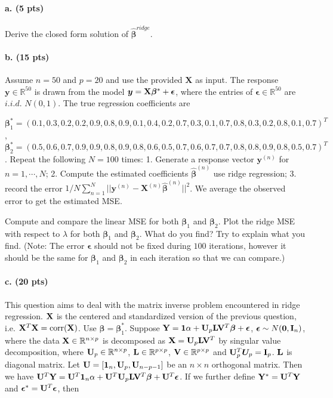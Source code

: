 \documentclass[11pt]{article}
\newcommand{\Imat}{{\bf I}}
\newcommand{\Lmat}[0]{{{\bf L}}}
\newcommand{\Umat}[0]{{{\bf U}}}
\newcommand{\Vmat}[0]{{{\bf V}}}
\newcommand{\Xmat}[0]{{{\bf X}}}
\newcommand{\Ymat}{{\bf Y}}
\newcommand{\yv}{\boldsymbol{y}}
\newcommand{\betav}[0]{{\boldsymbol{\beta}}}
\newcommand{\epsilonv}{\boldsymbol{\epsilon}}
\begin{document}
\paragraph{a. (5 pts)} Derive the closed form solution of $\hat{\betav}^{ridge}$. 
\paragraph{b. (15 pts)} Assume $n=50$ and $p=20$ and use the provided $\bm X$ as input.
The response $\yv\in\mathbb{R}^{50}$ is drawn from the model $\yv=\Xmat\betav^*+\epsilonv$, where the entries of $\epsilonv\in\mathbb{R}^{50}$ are $i.i.d.$ $N(0,1)$.
The true regression coefficients are 

\noindent$\betav_1^*=(0.1,0.3,0.2,0.2,0.9,0.8,0.9,0.1,0.4,0.2,0.7,0.3,0.1,0.7,0.8,0.3,0.2,0.8,0.1,0.7)^T$, $\betav_2^*=(0.5,0.6,0.7,0.9,0.9,0.8,0.9,0.8,0.6,0.5,0.7,0.6,0.7,0.7,0.8,0.8,0.9,0.8,0.5,0.7)^T$.
Repeat the following $N = 100$ times: 1. Generate a response vector $\yv^{(n)}$ for $n=1,\cdots,N$; 2. Compute the estimated coefficients $\hat{\betav}^{(n)}$ use ridge regression; 
3. record the error $1/N\sum_{n=1}^{N}||\yv^{(n)}-\bm X^{(n)}\hat{\betav}^{(n)}||^2$. We average the observed error to get the estimated MSE.

Compute and compare the linear MSE for both $\betav_1$ and $\betav_2$. Plot the ridge MSE with respect to $\lambda$ for both $\betav_1$ and $\betav_2$. What do you find? Try to explain what you find. (Note: The error $\epsilonv$ should not be fixed during $100$ iterations, however it should be the same for $\betav_1$ and $\betav_2$ in each iteration so that we can compare.)

\paragraph{c. (20 pts)} This question aims to deal with the matrix inverse problem encountered in ridge regression. $\Xmat$ is the centered and standardized version of the previous question, i.e. $\Xmat^T \Xmat = \text{corr}(\Xmat)$. Use $\betav = \betav_1^*$. Suppose $ \Ymat = \bm 1 \alpha + \Umat_p \Lmat \Vmat^T \betav  + \epsilonv$, $\epsilonv \sim N(\bm 0, \Imat_n)$, where the data $\Xmat \in \mathbb{R}^{n \times p}$ is decomposed as $\Xmat = \Umat_p \Lmat \Vmat^T$ by singular value decomposition, where $\Umat_p \in \mathbb{R}^{n \times p}$, $\Lmat \in \mathbb{R}^{p \times p}$, $\Vmat \in \mathbb{R}^{p \times p}$ and $\Umat_p^T \bm U_p = \Imat_p$. $\Lmat$ is diagonal matrix. Let $\Umat = [\bm 1_n, \Umat_p , \Umat_{n-p-1}]$ be an $n \times n$ orthogonal matrix. Then we have $\Umat^T  \Ymat = \Umat^T \bm 1_n \alpha + \Umat^T \Umat_p \Lmat \Vmat^T \betav  + \Umat^T  \epsilonv$. If we further define $\Ymat^* = \Umat^T \Ymat$ and $\epsilonv^* = \Umat^T \epsilonv$, then
\end{document}
